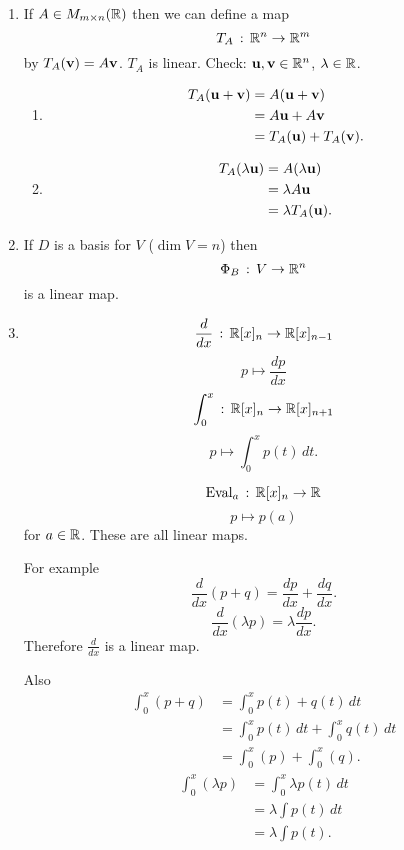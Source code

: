 \documentclass[10pt, a4paper]{article}
\begin{document}
\begin{example}
    \begin{enumerate}[label = (\roman*)]
        \item If $A \in M_{m \times n}(\mathbb{R})$ then we can define a map
        \[
        T_A\,:\,\mathbb{R} ^ n \rightarrow \mathbb{R} ^ m
        \]
        by $T_A(\mathbf{v}) = A\mathbf{v}$.
        $T_A$ is linear.
        Check:
        $\mathbf{u, v} \in \mathbb{R} ^ n$,
        $\lambda \in \mathbb{R}$.
        \begin{enumerate}[label = (\roman*)]
            \item 
            \begin{align*}
                T_A(\mathbf{u + v}) &= A(\mathbf{u + v}) \\
                &= A\mathbf{u} + A\mathbf{v} \\
                &= T_A(\mathbf{u}) + T_A(\mathbf{v}).
            \end{align*}
            \item
            \begin{align*}
                T_A(\lambda\mathbf{u}) &= A(\lambda\mathbf{u}) \\
                &= \lambda A\mathbf{u} \\
                &= \lambda T_A(\mathbf{u}).
            \end{align*}
        \end{enumerate}
        \item If $D$ is a basis for $V$
        ($\dim{V} = n$)
        then
        \[
        \Phi_{B}\,:\, V \rightarrow \mathbb{R} ^ n
        \]
        is a linear map.
        \item
        \[
        \frac{d}{dx}\,:\,\mathbb{R}[x]_n \rightarrow \mathbb{R}[x]_{n - 1}
        \]
        \[
        p \mapsto \frac{dp}{dx}
        \]
        \[
        \int_{0}^{x}\,:\,\mathbb{R}[x]_n \rightarrow \mathbb{R}[x]_{n + 1}
        \]
        \[
        p \mapsto \int_{0}^{x}p(t)\,dt.
        \]

        \[
        \mathrm{Eval}_a\,:\,\mathbb{R}[x]_n \rightarrow \mathbb{R}
        \]
        \[
        p \mapsto p(a)
        \]
        for $a \in \mathbb{R}$.
        These are all linear maps.

        For example
        \[
        \frac{d}{dx}(p + q) = \frac{dp}{dx} + \frac{dq}{dx}.
        \]
        \[
        \frac{d}{dx}(\lambda p) = \lambda\frac{dp}{dx}.
        \]
        Therefore $\frac{d}{dx}$ is a linear map.

        Also
        \begin{align*}
            \int_{0}^{x}(p + q) &= \int_{0}^{x}p(t) + q(t)\,dt \\
            &= \int_{0}^{x}p(t)\,dt + \int_{0}^{x}q(t)\,dt \\
            &= \int_{0}^{x}(p) + \int_{0}^{x}(q).
        \end{align*}
        \begin{align*}
            \int_{0}^{x}(\lambda p) &= \int_{0}^{x}\lambda p(t)\,dt \\
            &= \lambda\int p(t)\,dt \\
            &= \lambda\int p(t). \\
        \end{align*}


\end{enumerate}
\end{example}
\end{document}
